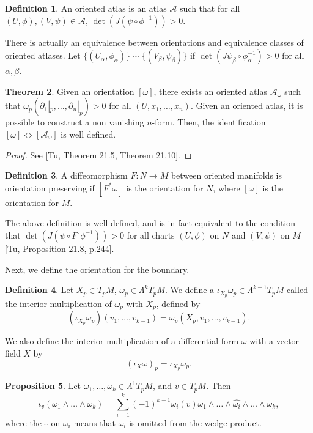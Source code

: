 \documentclass[]{article}
\DeclareMathOperator{\Det}{det}
\theoremstyle{definition}
\newtheorem{theorem}{Theorem}[section] %
\theoremstyle{definition}
\newtheorem{definition}[theorem]{Definition} %
\newtheorem{proposition}[theorem]{Proposition}
\begin{document}
\begin{definition}
    An oriented atlas is an atlas $\mathcal{A}$ such that for all $(U, \phi),(V, \psi)\in \mathcal{A}$, $\Det(J(\psi\circ\phi ^{-1}))>0$.
\end{definition}

There is actually an equivalence between orientations and equivalence classes of oriented atlases. Let $\{(U_\alpha, \phi_\alpha)\}\sim \{(V_\beta, \psi_\beta)\}$ if $\Det(J\psi_\beta\circ\phi^{-1}_\alpha)>0$ for all $\alpha, \beta$.

\begin{theorem}
    Given an orientation $[\omega]$, there exists an oriented atlas $\mathcal{A}_\omega$ such that $\omega_p(\partial_1|_p,\dots,\partial_n|_p)>0$ for all $(U, x_1, \dots, x_n)$. Given an oriented atlas, it is possible to construct a non vanishing $n$-form. Then, the identification $[\omega]\Leftrightarrow[\mathcal{A}_\omega]$ is well defined.
\end{theorem}

\begin{proof}
    See [Tu, Theorem 21.5, Theorem 21.10].
\end{proof}

\begin{definition}
    A diffeomorphism $F:N \rightarrow M$ between oriented manifolds is orientation preserving if $[F^*\omega]$ is the orientation for $N$, where $[\omega]$ is the orientation for $M$.
\end{definition}

The above definition is well defined, and is in fact equivalent to the condition that $\Det(J(\psi\circ F^\circ\phi^{-1}))>0$ for all charts $(U, \phi)$ on $N$ and $(V, \psi)$ on $M$ [Tu, Proposition 21.8, p.244].



Next, we define the orientation for the boundary.
\begin{definition}
    Let $X_p\in T_pM$, $\omega_p\in \Lambda^kT_pM$. We define a $\iota_{X_p}\omega_p\in \Lambda^{k-1}T_pM$ called the interior multiplication of $\omega_p$ with $X_p$, defined by
    \[(\iota_{X_p}\omega_p)(v_1, \dots, v_{k-1})=\omega_p(X_p, v_1, \dots, v_{k-1}).\]
\end{definition}

We also define the interior multiplication of a differential form $\omega$ with a vector field $X$ by
\[(\iota_X\omega)_p=\iota_{X_p}\omega_p.\]

\begin{proposition}
    Let $\omega_1, \dots, \omega_k\in \Lambda^1T_pM$, and $v\in T_pM$. Then \[\iota_v(\omega_1\wedge \dots\wedge \omega_k)=\sum_{i=1}^k (-1)^{k-1}\omega_i(v)\omega_1\wedge\dots\wedge\widehat{\omega_i}\wedge\dots\wedge\omega_k,\] where the $\widehat{\ \ }$ on $\omega_i$ means that $\omega_i$ is omitted from the wedge product.
\end{proposition}
\end{document}
